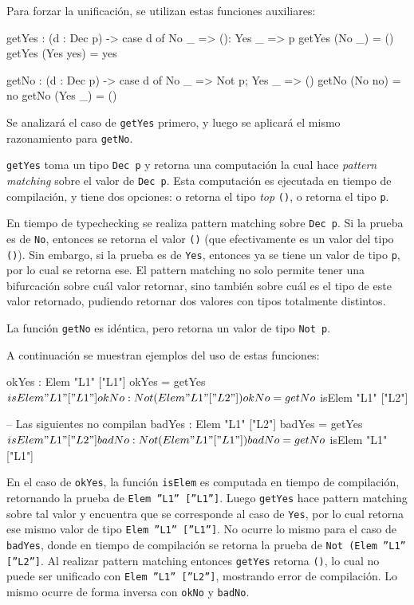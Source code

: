 Para forzar la unificación, se utilizan estas funciones auxiliares:

\begin{code}
getYes : (d : Dec p) ->
  case d of { No _ => (): Yes _ => p }
getYes (No _) = ()
getYes (Yes yes) = yes

getNo : (d : Dec p) ->
  case d of { No _ => Not p; Yes _ => () }
getNo (No no) = no
getNo (Yes _) = ()
\end{code}

Se analizará el caso de \texttt{getYes} primero, y luego se aplicará el mismo razonamiento para \texttt{getNo}.

\texttt{getYes} toma un tipo \texttt{Dec p} y retorna una computación la cual hace \textit{pattern matching} sobre el valor de \texttt{Dec p}. Esta computación es ejecutada en tiempo de compilación, y tiene dos opciones: o retorna el tipo \textit{top} \texttt{()}, o retorna el tipo \texttt{p}.

En tiempo de typechecking se realiza pattern matching sobre \texttt{Dec p}. Si la prueba es de \texttt{No}, entonces se retorna el valor \texttt{()} (que efectivamente es un valor del tipo \texttt{()}). Sin embargo, si la prueba es de \texttt{Yes}, entonces ya se tiene un valor de tipo \texttt{p}, por lo cual se retorna ese. El pattern matching no solo permite tener una bifurcación sobre cuál valor retornar, sino también sobre cuál es el tipo de este valor retornado, pudiendo retornar dos valores con tipos totalmente distintos.

La función \texttt{getNo} es idéntica, pero retorna un valor de tipo \texttt{Not p}.

A continuación se muestran ejemplos del uso de estas funciones:

\begin{code}
okYes : Elem "L1" ["L1"]
okYes = getYes $ isElem "L1" ["L1"]

okNo : Not (Elem "L1" ["L2"])
okNo = getNo $ isElem "L1" ["L2"]

-- Las siguientes no compilan
badYes : Elem "L1" ["L2"]
badYes = getYes $ isElem "L1" ["L2"]

badNo : Not (Elem "L1" ["L1"])
badNo = getNo $ isElem "L1" ["L1"]
\end{code}

En el caso de \texttt{okYes}, la función \texttt{isElem} es computada en tiempo de compilación, retornando la prueba de \texttt{Elem ''L1'' [''L1'']}. Luego \texttt{getYes} hace pattern matching sobre tal valor y encuentra que se corresponde al caso de \texttt{Yes}, por lo cual retorna ese mismo valor de tipo \texttt{Elem ''L1'' [''L1'']}. No ocurre lo mismo para el caso de \texttt{badYes}, donde en tiempo de compilación se retorna la prueba de \texttt{Not (Elem ''L1'' [''L2'']}. Al realizar pattern matching entonces \texttt{getYes} retorna \texttt{()}, lo cual no puede ser unificado con \texttt{Elem ''L1'' [''L2'']}, mostrando error de compilación. Lo mismo ocurre de forma inversa con \texttt{okNo} y \texttt{badNo}.

